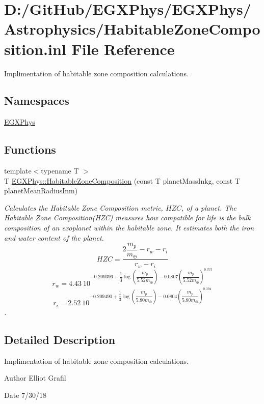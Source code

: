 \hypertarget{_habitable_zone_composition_8inl}{}\section{D\+:/\+Git\+Hub/\+E\+G\+X\+Phys/\+E\+G\+X\+Phys/\+Astrophysics/\+Habitable\+Zone\+Composition.inl File Reference}
\label{_habitable_zone_composition_8inl}


Implimentation of habitable zone composition calculations.  


\subsection*{Namespaces}
\begin{DoxyCompactItemize}
\item 
 \mbox{\hyperlink{namespace_e_g_x_phys}{E\+G\+X\+Phys}}
\end{DoxyCompactItemize}
\subsection*{Functions}
\begin{DoxyCompactItemize}
\item 
{\footnotesize template$<$typename T $>$ }\\T \mbox{\hyperlink{group___e_g_x_phys-_astrophysics-_habitable_zone_composition_ga9fe32e7d12b68d2596a0a8409681acdc}{E\+G\+X\+Phys\+::\+Habitable\+Zone\+Composition}} (const T planet\+Mass\+Inkg, const T planet\+Mean\+Radius\+Inm)
\begin{DoxyCompactList}\small\item\em Calculates the Habitable Zone Composition metric, $HZC$, of a planet. The Habitable Zone Composition(\+H\+Z\+C) measures how compatible for life is the bulk composition of an exoplanet within the habitable zone. It estimates both the iron and water content of the planet. \[ HZC= \dfrac{ 2\dfrac{m_p}{m_{\oplus}} - r_w - r_i } { r_w - r_i } \] \[ r_w= 4.43\ 10^{ -0.209396 + \dfrac{1}{3}\log \left ( \dfrac{m_p}{5.52 m_\oplus} \right ) - 0.0807 \left ( \dfrac{m_p}{5.52 m_\oplus} \right )^{0.375}} \] \[ r_i= 2.52\ 10^{ -0.209490 + \dfrac{1}{3}\log \left ( \dfrac{m_p}{5.80 m_\oplus} \right ) - 0.0804 \left ( \dfrac{m_p}{5.80 m_\oplus} \right )^{0.394}} \]. \end{DoxyCompactList}\end{DoxyCompactItemize}


\subsection{Detailed Description}
Implimentation of habitable zone composition calculations. 

\begin{DoxyAuthor}{Author}
Elliot Grafil 
\end{DoxyAuthor}
\begin{DoxyDate}{Date}
7/30/18 
\end{DoxyDate}
